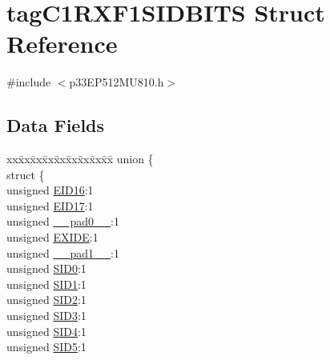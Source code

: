 \hypertarget{structtag_c1_r_x_f1_s_i_d_b_i_t_s}{}\section{tag\+C1\+R\+X\+F1\+S\+I\+D\+B\+I\+TS Struct Reference}
\label{structtag_c1_r_x_f1_s_i_d_b_i_t_s}


{\ttfamily \#include $<$p33\+E\+P512\+M\+U810.\+h$>$}

\subsection*{Data Fields}
\begin{DoxyCompactItemize}
\item 
\begin{tabbing}
xx\=xx\=xx\=xx\=xx\=xx\=xx\=xx\=xx\=\kill
union \{\\
\>struct \{\\
\>\>unsigned \hyperlink{structtag_c1_r_x_f1_s_i_d_b_i_t_s_a6dd5663b0c9838c56db040560ca0efa1}{EID16}:1\\
\>\>unsigned \hyperlink{structtag_c1_r_x_f1_s_i_d_b_i_t_s_aa648615464b0eb29967529333eee9fd9}{EID17}:1\\
\>\>unsigned \hyperlink{structtag_c1_r_x_f1_s_i_d_b_i_t_s_adf71f3d8410c1f1dbbc96680a92c49af}{\_\_pad0\_\_}:1\\
\>\>unsigned \hyperlink{structtag_c1_r_x_f1_s_i_d_b_i_t_s_a09ff1c1be3927220bd3dfbc10edfe243}{EXIDE}:1\\
\>\>unsigned \hyperlink{structtag_c1_r_x_f1_s_i_d_b_i_t_s_acaf2d0924a107ec6e8d2e31febaf66f9}{\_\_pad1\_\_}:1\\
\>\>unsigned \hyperlink{structtag_c1_r_x_f1_s_i_d_b_i_t_s_a1ca276ac15df60e1f7b9a6d0011ade93}{SID0}:1\\
\>\>unsigned \hyperlink{structtag_c1_r_x_f1_s_i_d_b_i_t_s_a3405d354f81391f879648f69f504dfc8}{SID1}:1\\
\>\>unsigned \hyperlink{structtag_c1_r_x_f1_s_i_d_b_i_t_s_ad744966dfc49307f731b7045b01b94e5}{SID2}:1\\
\>\>unsigned \hyperlink{structtag_c1_r_x_f1_s_i_d_b_i_t_s_a9345f3e64720be93e83d8dfc827f3f45}{SID3}:1\\
\>\>unsigned \hyperlink{structtag_c1_r_x_f1_s_i_d_b_i_t_s_aefb106fed4bb40e2c3c71ac612c554e3}{SID4}:1\\
\>\>unsigned \hyperlink{structtag_c1_r_x_f1_s_i_d_b_i_t_s_a0f221b3c9612231686bf87ccdcec8489}{SID5}:1\\

\end{tabbing}
\end{DoxyCompactItemize}

